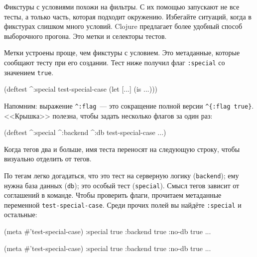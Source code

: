 
Фикстуры с условиями похожи на фильтры. С их помощью запускают не все тесты, а
только часть, которая подходит окружению. Избегайте ситуаций, когда в фикстурах
слишком много условий. Clojure предлагает более удобный способ выборочного
прогона. Это метки и селекторы тестов.

Метки устроены проще, чем фикстуры с условием. Это метаданные, которые сообщают
тесту при его создании. Тест ниже получил флаг \verb|:special| со значением
\verb|true|.

\begin{english}
  \begin{clojure}
(deftest ^:special test-special-case
  (let [...]
    (is ...)))
  \end{clojure}
\end{english}


Напомним: выражение \verb|^:flag|~--- это сокращение полной версии
\verb|^{:flag true}|. <<Крышка>> полезна, чтобы задать несколько флагов за один
раз:

\begin{english}
  \begin{clojure}
(deftest ^:special ^:backend ^:db
  test-special-case
  ...)
  \end{clojure}
\end{english}

\noindent
Когда тегов два и больше, имя теста переносят на следующую строку, чтобы
визуально отделить от тегов.

По тегам легко догадаться, что это тест на серверную логику (\verb|backend|);
ему нужна база данных (\verb|db|); это особый тест (\verb|special|). Смысл
тегов зависит от соглашений в команде. Чтобы проверить флаги, прочитаем
метаданные переменной \verb|test-special-case|. Среди прочих полей вы найдёте
\verb|:special| и остальные:

\ifnarrow

\begin{english}
  \begin{clojure}
(meta #'test-special-case)
{:special true
 :backend true
 :no-db true ...}
  \end{clojure}
\end{english}

\else

\begin{english}
  \begin{clojure}
(meta #'test-special-case)
{:special true :backend true :no-db true ...}
  \end{clojure}
\end{english}

